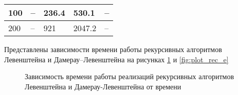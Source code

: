 \begin{table}[h]
\begin{tabular}{||l|llll||}
    100        & --                                                                & 236.4                                                             & 530.1                                                                     & --                                                                         \\ \hline
    200        & --                                                                & 921                                                               & 2047.2                                                                    & --                                                                         \\ \hline
    \end{tabular}
    \label{tbl:time}
    \end{table}

Представлены зависимости времени работы рекурсивных алгоритмов Левенштейна и Дамерау--Левенштейна на рисунках \ref{fig:plot_rec_l} и \ref{fig:plot_rec_e}

\begin{figure}[h]
    \centering
    

    \caption{Зависимость времени работы реализаций рекурсивных алгоритмов Левенштейна и Дамерау-Левенштейна от времени}
    \label{fig:plot_rec_l}
\end{figure} 


